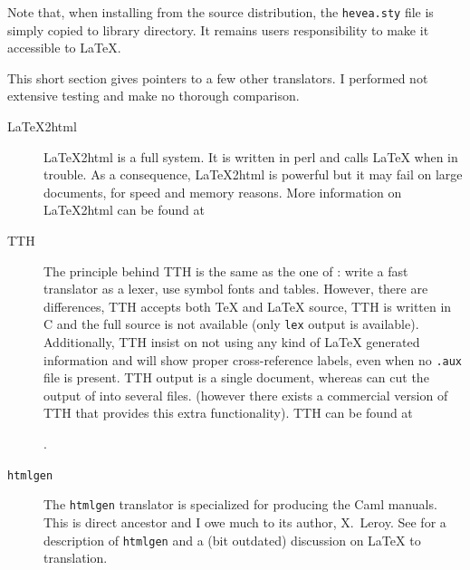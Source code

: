 Note that, when installing \hevea{} from the source distribution, the
\texttt{hevea.sty} file is simply copied to \hevea{}
library directory. It remains users responsibility to
make it accessible to \LaTeX.

This short section gives pointers to a few other translators. I
performed not extensive testing and make no thorough comparison.
\begin{description}
\item[LaTeX2html]
LaTeX2html is a full system. It is written in perl and
calls \LaTeX{} when in trouble.
As a consequence, LaTeX2html is powerful but it may fail on
large documents, for speed and memory reasons.
More information on LaTeX2html can be found at
\begin{center}
\end{center}

\item[TTH] The principle behind TTH is the same as the one of
\hevea{}: write a fast translator as a lexer, use symbol fonts and
tables. However, there are differences, TTH accepts both \TeX{} and
\LaTeX{} source, 
TTH is written in C and the full source is not available
(only \verb+lex+ output is available).
Additionally, TTH  insist on not using any kind of \LaTeX{}
generated information and will show proper cross-reference labels,
even when no \texttt{.aux} file is present.
TTH output is a single document,
whereas \hacha{} can cut the output of \hevea{} into several files.
(however there exists a commercial
version of TTH that provides this extra functionality).
TTH can be found at
\begin{center}
.
\end{center}

\item[\texttt{htmlgen}] The \texttt{htmlgen} translator is specialized
for producing the Caml manuals. This is \hevea{} direct ancestor and I
owe much to its author, X.~Leroy. See \cite{htmlgen} for a description
of \texttt{htmlgen} and a (bit outdated) discussion on \LaTeX{} to
\html{} translation.
\end{description}

